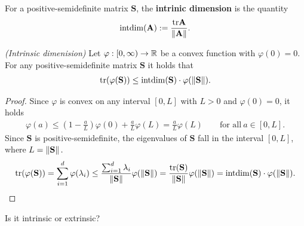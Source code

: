 \begin{definition}
  \label{rmineq_intrinsic_bernstein}
  For a positive-semidefinite matrix $\mathbf{S}$,
  the \textbf{intrinic dimension} is the quantity
  \begin{gather*}
    \mathrm{intdim}
    (\mathbf{A})
    :=
    \frac{\mathrm{tr}\mathbf{A}}{\left\lVert\mathbf{A}\right\rVert}
    .
  \end{gather*}
\end{definition}
\begin{lemma}
  \emph{(Intrinsic dimenision)}
  Let 
  $
    \varphi: [0,\infty) \to \mathbb{R}
  $
  be a convex function with
  $
    \varphi(0)=0.
  $
  For any positive-semidefinite matrix $\mathbf{S}$ it holds that
  \begin{gather*}
    \mathrm{tr}(\varphi(\mathbf{S}))
    \le
    \mathrm{intdim}(\mathbf{S})
    \cdot
    \varphi(\left\lVert\mathbf{S}\right\rVert)
    .
  \end{gather*}
\end{lemma}
\begin{proof}
  \emph{\cite[Lemma~7.5.1]{Tropp2015}}
  Since $\varphi$ is convex on any interval $[0,L]$ with $L>0$ and $\varphi(0)=0$, it holds
  \begin{gather}
    \varphi(a)
    \le
    \left( 
      1 - \frac{a}{L}
    \right)
    \varphi(0)
    +
    \frac{a}{L}
    \varphi(L)
    =
    \frac{a}{L}
    \varphi(L)
    \qquad
    \text{for all}\ 
    a \in [0,L]
    .
  \end{gather}
  Since $\mathbf{S}$ is positive-semidefinite, the eigenvalues of $\mathbf{S}$ 
  fall in the interval $[0,L]$, where $L=\left\lVert\mathbf{S}\right\rVert.$
  \begin{gather}
    \mathrm{tr}(\varphi(\mathbf{S}))
    =
    \sum_{i=1}^{d}
    \varphi(\lambda_i)
    \le
    \frac{
    \sum_{i=1}^{d}
    \lambda_i
    }{\left\lVert\mathbf{S}\right\rVert}
    \varphi(\left\lVert\mathbf{S}\right\rVert)
    =
    \frac{\mathrm{tr}(\mathbf{S})}{\left\lVert\mathbf{S}\right\rVert}
    \varphi(\left\lVert\mathbf{S}\right\rVert)
    =
    \mathrm{intdim}(\mathbf{S})
    \cdot
    \varphi(\left\lVert\mathbf{S}\right\rVert)
    .
  \end{gather}
\end{proof}
\begin{takeaways}
  Is it intrinsic or extrinsic?
  \lipsum[4]
\end{takeaways}
